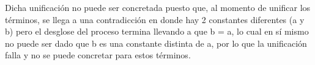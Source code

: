 \documentclass[11pt, letterpaper]{article}
\begin{document}
Dicha unificación no puede ser concretada puesto que, al momento de unificar los términos, se llega a una contradicción en donde hay 2 constantes diferentes (a y b) pero el desglose del proceso termina llevando a que b = a, lo cual en sí mismo no puede ser dado que b es una constante distinta de a, por lo que la unificación falla y no se puede concretar para estos términos.

\newpage




\end{document}
